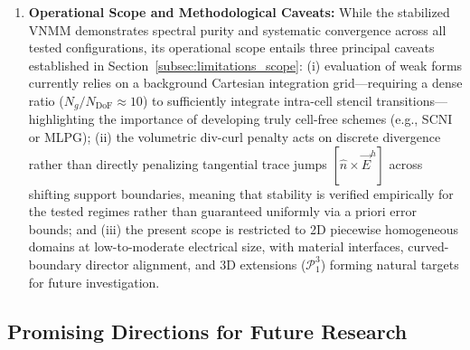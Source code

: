 \documentclass[preprint,12pt]{elsarticle}
\begin{document}
\begin{enumerate}
    \item \textbf{Operational Scope and Methodological Caveats:}
          While the stabilized VNMM demonstrates spectral purity and systematic convergence across all tested configurations, its operational scope entails three principal caveats established in Section~\ref{subsec:limitations_scope}: (i) evaluation of weak forms currently relies on a background Cartesian integration grid---requiring a dense ratio ($N_g / N_{\mathrm{DoF}} \approx 10$) to sufficiently integrate intra-cell stencil transitions---highlighting the importance of developing truly cell-free schemes (e.g., SCNI or MLPG); (ii) the volumetric div-curl penalty acts on discrete divergence rather than directly penalizing tangential trace jumps $[\hat{n} \times \vec{E}^h]$ across shifting support boundaries, meaning that stability is verified empirically for the tested regimes rather than guaranteed uniformly via a priori error bounds; and (iii) the present scope is restricted to 2D piecewise homogeneous domains at low-to-moderate electrical size, with material interfaces, curved-boundary director alignment, and 3D extensions ($\mathcal{P}_1^3$) forming natural targets for future investigation.
\end{enumerate}

\subsection{Promising Directions for Future Research}
\label{subsec:future_works}
\end{document}

